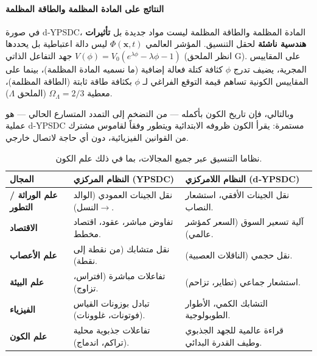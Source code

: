 \documentclass[11pt,a4paper]{article}
\begin{document}
	\paragraph*{النتائج على المادة المظلمة والطاقة المظلمة}
	في صورة d‑YPSDC، المادة المظلمة والطاقة المظلمة ليست مواد جديدة بل \textbf{تأثيرات هندسية ناشئة} لحقل التنسيق. المؤشر العالمي $\Phi(\mathbf{x},t)$ ليس دالة اعتباطية بل يحددها جهد التفاعل الذاتي $V(\phi) = V_0 (e^{\lambda \phi} - \lambda \phi - 1)$ (انظر الملحق G). على المقاييس المجرية، يضيف تدرج $\phi$ كثافة كتلة فعالة إضافية (ما نسميه المادة المظلمة)، بينما على المقاييس الكونية تساهم قيمة التوقع الفراغي لـ $\phi$ بكثافة طاقة ثابتة (الطاقة المظلمة)، معطية $\Omega_\Lambda = 2/3$ (الملحق $\Lambda$).
	
	وبالتالي، فإن تاريخ الكون بأكمله — من التضخم إلى التمدد المتسارع الحالي — هو عملية d‑YPSDC مستمرة: يقرأ الكون ظروفه الابتدائية ويتطور وفقاً لقاموس مشترك من القوانين الفيزيائية، دون أي حاجة لاتصال خارجي.
	
	\begin{table}[htbp]
		\centering
		\caption{نظاما التنسيق عبر جميع المجالات، بما في ذلك علم الكون.}
		\label{tab:two-regimes-full}
		\begin{english}
			\begin{tabular}{p{2.5cm}p{4.5cm}p{4.5cm}}
				\toprule
				\textbf{المجال} & \textbf{النظام المركزي (YPSDC)} & \textbf{النظام اللامركزي (d‑YPSDC)} \\
				\midrule
				\textbf{علم الوراثة / التطور} &
				نقل الجينات العمودي (الوالد$\to$النسل). &
				نقل الجينات الأفقي، استشعار النصاب. \\
				\midrule
				\textbf{الاقتصاد} &
				تفاوض مباشر، عقود، اقتصاد مخطط. &
				آلية تسعير السوق (السعر كمؤشر عالمي). \\
				\midrule
				\textbf{علم الأعصاب} &
				نقل متشابك (من نقطة إلى نقطة). &
				نقل حجمي (الناقلات العصبية). \\
				\midrule
				\textbf{علم البيئة} &
				تفاعلات مباشرة (افتراس، تزاوج). &
				استشعار جماعي (تطاير، تزاحم). \\
				\midrule
				\textbf{الفيزياء} &
				تبادل بوزونات القياس (فوتونات، غلوونات). &
				التشابك الكمي، الأطوار الطوبولوجية. \\
				\midrule
				\textbf{علم الكون} &
				تفاعلات جذبوية محلية (تراكم، اندماج). &
				قراءة عالمية للجهد الجذبوي وطيف القدرة البدائي. \\
				\bottomrule
			\end{tabular}
		\end{english}
	\end{table}
	
\end{document}
